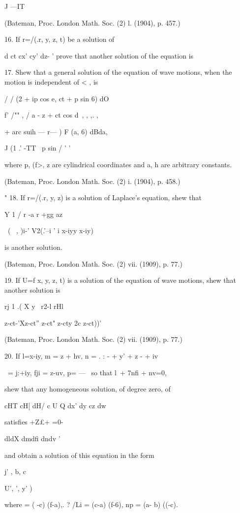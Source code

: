 J —IT 

(Bateman, Proc. London Math. Soc. (2) l. (1904), p. 457.) 

16. If r=/(.r, y, z, t) be a solution of 

d  ct cx' cy'  dz- ' 
prove that another solution of the equation is 

17. Shew that a general solution of the equation of wave motions, when the motion is 
independent of < , is 

/ / (2 + ip cos e, ct + p sin 6) dO 

f' /""   , / a -   z + ct cos d\  ,  , ,. , 

+ arc suih —  r—   ) F (a, 6) dBda, 

J (1 .' -TT \ p sin   / ' ' 

where p, (f>, z are cylindrical coordinates and a, h are arbitrary constants. 

(Bateman, Proc. London Math. Soc. (2) i. (1904), p. 458.) 

"  18. If r=/(.r, y, z) is a solution of Laplace's equation, shew that 

Y  1  / r -a  r +gg az \ 

~( \ , )i-' V2(.'--i '  i x-iyy x-iy) 

is another solution.   

(Bateman, Proc. London Math. Soc. (2) vii. (1909), p. 77.) 

19. If U=f x, y, z, t) is a solution of the equation of wave motions, shew that 
another solution is 

rj  1 .( X y \ r2-l rHl \ 

z-ct-'Xz-ct'' z-ct"   z-cty 2c z-ct))' 

(Bateman, Proc. London Math. Soc. (2) vii. (1909), p. 77.) 

20. If l=x-iy, m = z + hv, n = . : - + y'  + z - + iv%

\ = j:+iy, fji = z-uv, p= — \, 
so that l\ + 7nfi + nv=0, 

shew that any homogeneous solution, of degree zero, of 

cHT cH[ dH/ c U Q 
dx'  dy  cz  dw  

satisfies  +Z£+ =0- 

dldX dmdfi dndv ' 

and obtain a solution of this equation in the form 

j' , b, c \ 

U',  ', y' ) 

where   = ( -c) (f-a),. ? /Li = (c-a) (f-6), np = (a- b) ((-c). 

